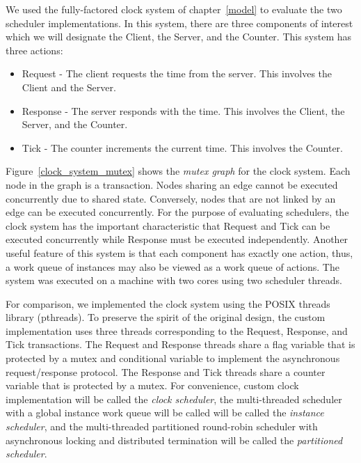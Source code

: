 We used the fully-factored clock system of chapter~\ref{model} to evaluate the two scheduler implementations.
In this system, there are three components of interest which we will designate the Client, the Server, and the Counter.
This system has three actions:
\begin{itemize}
  \item Request - The client requests the time from the server.  This involves the Client and the Server.
  \item Response - The server responds with the time.  This involves the Client, the Server, and the Counter.
  \item Tick - The counter increments the current time.  This involves the Counter.
\end{itemize}
Figure~\ref{clock_system_mutex} shows the \emph{mutex graph} for the clock system.
Each node in the graph is a transaction.
Nodes sharing an edge cannot be executed concurrently due to shared state.
Conversely, nodes that are not linked by an edge can be executed concurrently.
For the purpose of evaluating schedulers, the clock system has the important characteristic that Request and Tick can be executed concurrently while Response must be executed independently.
Another useful feature of this system is that each component has exactly one action, thus, a  work queue of instances may also be viewed as a work queue of actions.
The system was executed on a machine with two cores using two scheduler threads.

For comparison, we implemented the clock system using the POSIX threads library (pthreads).
To preserve the spirit of the original design, the custom implementation uses three threads corresponding to the Request, Response, and Tick transactions.
The Request and Response threads share a flag variable that is protected by a mutex and conditional variable to implement the asynchronous request/response protocol.
The Response and Tick threads share a counter variable that is protected by a mutex.
For convenience, custom clock implementation will be called the \emph{clock scheduler}, the multi-threaded scheduler with a global instance work queue will be called will be called the \emph{instance scheduler}, and the multi-threaded partitioned  round-robin scheduler with asynchronous locking and distributed termination will be called the \emph{partitioned scheduler}.

